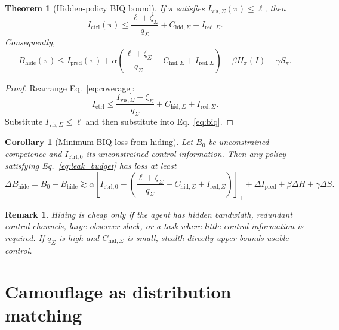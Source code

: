 \documentclass[10pt]{article}
\newtheorem{theorem}{Theorem}
\newtheorem{corollary}{Corollary}
\newtheorem{remark}{Remark}
\newcommand{\pos}[1]{\left[#1\right]_+}
\begin{document}
\begin{theorem}[Hidden-policy BIQ bound]
If \(\pi\) satisfies \(I_{\mathrm{vis},\Sigma}(\pi)\le\ell\), then
\begin{equation}
I_{\mathrm{ctrl}}(\pi)
\le
\frac{\ell+\zeta_\Sigma}{q_\Sigma}
+
C_{\mathrm{hid},\Sigma}
+
I_{\mathrm{red},\Sigma}.
\label{eq:ctrl_bound}
\end{equation}
Consequently,
\begin{equation}
B_{\mathrm{hide}}(\pi)
\le
I_{\mathrm{pred}}(\pi)
+
\alpha
\left(
\frac{\ell+\zeta_\Sigma}{q_\Sigma}
+
C_{\mathrm{hid},\Sigma}
+
I_{\mathrm{red},\Sigma}
\right)
-
\beta H_\pi(I)
-
\gamma S_\pi.
\label{eq:Bhide}
\end{equation}
\end{theorem}

\begin{proof}
Rearrange Eq.~\eqref{eq:coverage}:
\[
I_{\mathrm{ctrl}}
\le
\frac{I_{\mathrm{vis},\Sigma}+\zeta_\Sigma}{q_\Sigma}
+
C_{\mathrm{hid},\Sigma}
+
I_{\mathrm{red},\Sigma}.
\]
Substitute \(I_{\mathrm{vis},\Sigma}\le\ell\) and then substitute into Eq.~\eqref{eq:biq}.
\end{proof}

\begin{corollary}[Minimum BIQ loss from hiding]
Let \(B_0\) be unconstrained competence and \(I_{\mathrm{ctrl},0}\) its unconstrained control information. Then any policy satisfying Eq.~\eqref{eq:leak_budget} has loss at least
\begin{equation}
\Delta B_{\mathrm{hide}}
=
B_0-B_{\mathrm{hide}}
\gtrsim
\alpha
\pos{
I_{\mathrm{ctrl},0}
-
\left(
\frac{\ell+\zeta_\Sigma}{q_\Sigma}
+
C_{\mathrm{hid},\Sigma}
+
I_{\mathrm{red},\Sigma}
\right)
}
+
\Delta I_{\mathrm{pred}}
+
\beta\Delta H
+
\gamma\Delta S.
\label{eq:hide_loss}
\end{equation}
\end{corollary}

\begin{remark}
Hiding is cheap only if the agent has hidden bandwidth, redundant control channels, large observer slack, or a task where little control information is required. If \(q_\Sigma\) is high and \(C_{\mathrm{hid},\Sigma}\) is small, stealth directly upper-bounds usable control.
\end{remark}

\section{Camouflage as distribution matching}
\end{document}
